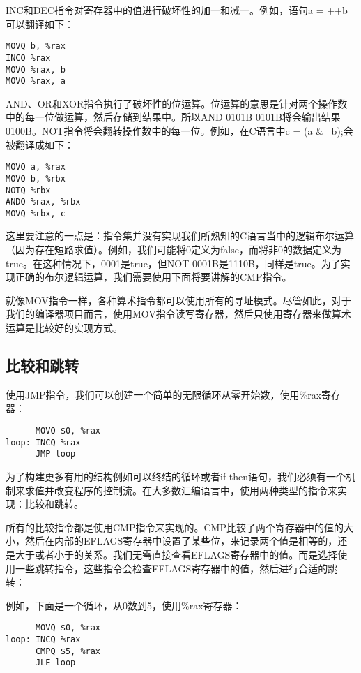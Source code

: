 \documentclass[cn,11pt,chinese]{elegantbook}
\begin{document}
INC和DEC指令对寄存器中的值进行破坏性的加一和减一。例如，语句a = ++b可以翻译如下：

\begin{verbatim}
MOVQ b, %rax
INCQ %rax
MOVQ %rax, b
MOVQ %rax, a
\end{verbatim}

AND、OR和XOR指令执行了破坏性的位运算。位运算的意思是针对两个操作数中的每一位做运算，然后存储到结果中。所以AND 0101B 0101B将会输出结果0100B。NOT指令将会翻转操作数中的每一位。例如，在C语言中c = (a \& ~b);会被翻译成如下：

\begin{verbatim}
MOVQ a, %rax
MOVQ b, %rbx
NOTQ %rbx
ANDQ %rax, %rbx
MOVQ %rbx, c
\end{verbatim}

这里要注意的一点是：指令集并没有实现我们所熟知的C语言当中的逻辑布尔运算（因为存在短路求值）。例如，我们可能将0定义为false，而将非0的数据定义为true。在这种情况下，0001是true，但NOT 0001B是1110B，同样是true。为了实现正确的布尔逻辑运算，我们需要使用下面将要讲解的CMP指令。

就像MOV指令一样，各种算术指令都可以使用所有的寻址模式。尽管如此，对于我们的编译器项目而言，使用MOV指令读写寄存器，然后只使用寄存器来做算术运算是比较好的实现方式。

\subsection{比较和跳转}

使用JMP指令，我们可以创建一个简单的无限循环从零开始数，使用\%rax寄存器：

\begin{verbatim}
      MOVQ $0, %rax
loop: INCQ %rax
      JMP loop
\end{verbatim}

为了构建更多有用的结构例如可以终结的循环或者if-then语句，我们必须有一个机制来求值并改变程序的控制流。在大多数汇编语言中，使用两种类型的指令来实现：比较和跳转。

所有的比较指令都是使用CMP指令来实现的。CMP比较了两个寄存器中的值的大小，然后在内部的EFLAGS寄存器中设置了某些位，来记录两个值是相等的，还是大于或者小于的关系。我们无需直接查看EFLAGS寄存器中的值。而是选择使用一些跳转指令，这些指令会检查EFLAGS寄存器中的值，然后进行合适的跳转：

例如，下面是一个循环，从0数到5，使用\%rax寄存器：

\begin{verbatim}
      MOVQ $0, %rax
loop: INCQ %rax
      CMPQ $5, %rax
      JLE loop
\end{verbatim}
\end{document}
